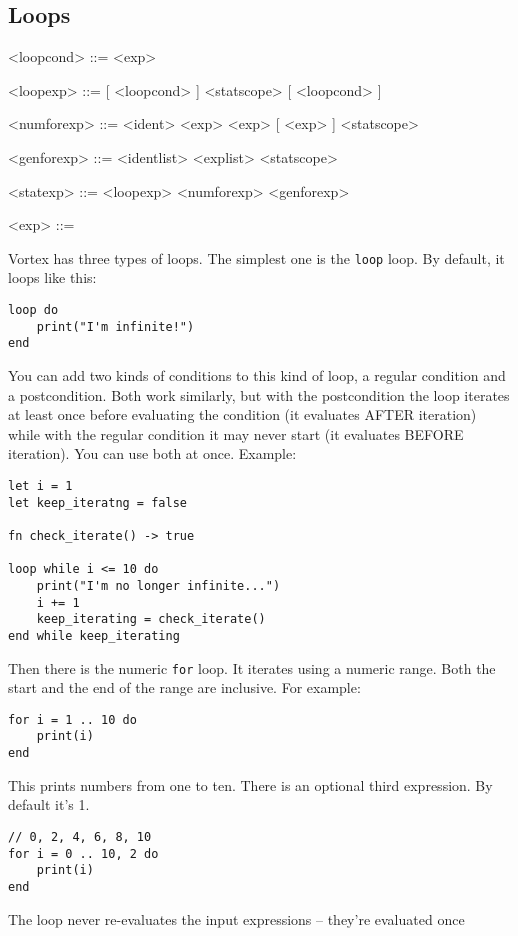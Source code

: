 \documentclass{article}
\newenvironment{bnf}
{
\begin{mdframed}
\begin{grammar}
}
{
\end{grammar}
\end{mdframed}
}
\begin{document}
\subsection{Loops}
\begin{bnf}
<loopcond> ::=  <exp>

<loopexp> ::=  [ <loopcond> ] <statscope> [ <loopcond> ]

<numforexp> ::=  <ident> \lit{=} <exp>  <exp>
    [ \lit{,} <exp> ] <statscope>

<genforexp> ::=  <identlist>  <explist> <statscope>

<statexp> ::= <loopexp>
    \alt <numforexp>
    \alt <genforexp>

<exp> ::= 
    \alt {}
    \alt {}
\end{bnf}
Vortex has three types of loops. The simplest one is the \verb|loop| loop.
By default, it loops like this:
\begin{lstlisting}[language=vortex]
loop do
    print("I'm infinite!")
end
\end{lstlisting}
You can add two kinds of conditions to this kind of loop, a regular condition
and a postcondition. Both work similarly, but with the postcondition the loop
iterates at least once before evaluating the condition (it evaluates AFTER
iteration) while with the regular condition it may never start (it evaluates
BEFORE iteration). You can use both at once. Example:
\begin{lstlisting}[language=vortex]
let i = 1
let keep_iteratng = false

fn check_iterate() -> true

loop while i <= 10 do
    print("I'm no longer infinite...")
    i += 1
    keep_iterating = check_iterate()
end while keep_iterating
\end{lstlisting}
Then there is the numeric \verb|for| loop. It iterates using a numeric range.
Both the start and the end of the range are inclusive. For example:
\begin{lstlisting}[language=vortex]
for i = 1 .. 10 do
    print(i)
end
\end{lstlisting}
This prints numbers from one to ten. There is an optional third 
expression. By default it's 1.
\begin{lstlisting}[language=vortex]
// 0, 2, 4, 6, 8, 10
for i = 0 .. 10, 2 do
    print(i)
end
\end{lstlisting}
The loop never re-evaluates the input expressions -- they're evaluated once
\end{document}
